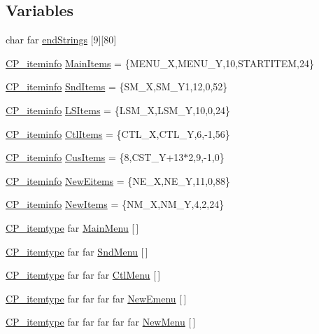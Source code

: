 \subsection*{Variables}
\begin{DoxyCompactItemize}
\item 
char far \hyperlink{WL__MENU_8C_a8e30ff9c9e815ba886bfde0ef75be6d8}{endStrings} \mbox{[}9\mbox{]}\mbox{[}80\mbox{]}
\item 
\hyperlink{structCP__iteminfo}{CP\_\-iteminfo} \hyperlink{WL__MENU_8C_a93c27abff0c41dacc4c91cba6616ebc8}{MainItems} = \{MENU\_\-X,MENU\_\-Y,10,STARTITEM,24\}
\item 
\hyperlink{structCP__iteminfo}{CP\_\-iteminfo} \hyperlink{WL__MENU_8C_a8810a70d8c0aacc1ea82e104825ef35e}{SndItems} = \{SM\_\-X,SM\_\-Y1,12,0,52\}
\item 
\hyperlink{structCP__iteminfo}{CP\_\-iteminfo} \hyperlink{WL__MENU_8C_a34ddf48c23c11489c6b6a7a538eae0da}{LSItems} = \{LSM\_\-X,LSM\_\-Y,10,0,24\}
\item 
\hyperlink{structCP__iteminfo}{CP\_\-iteminfo} \hyperlink{WL__MENU_8C_aa93dc2e5fac3ee3c385889cde68024dc}{CtlItems} = \{CTL\_\-X,CTL\_\-Y,6,-\/1,56\}
\item 
\hyperlink{structCP__iteminfo}{CP\_\-iteminfo} \hyperlink{WL__MENU_8C_a30fed5772336d6185ad27e183642b26e}{CusItems} = \{8,CST\_\-Y+13$\ast$2,9,-\/1,0\}
\item 
\hyperlink{structCP__iteminfo}{CP\_\-iteminfo} \hyperlink{WL__MENU_8C_a938f63a08d947fa7b0abf03c1349115a}{NewEitems} = \{NE\_\-X,NE\_\-Y,11,0,88\}
\item 
\hyperlink{structCP__iteminfo}{CP\_\-iteminfo} \hyperlink{WL__MENU_8C_a4374f166e5cf27153b8a6680ae1d0289}{NewItems} = \{NM\_\-X,NM\_\-Y,4,2,24\}
\item 
\hyperlink{structCP__itemtype}{CP\_\-itemtype} far \hyperlink{WL__MENU_8C_a6d3982b9d13e9f258a6229f7c6259fd2}{MainMenu} \mbox{[}$\,$\mbox{]}
\item 
\hyperlink{structCP__itemtype}{CP\_\-itemtype} far far \hyperlink{WL__MENU_8C_a59f90a4c2260476a35128aaffd9a8acb}{SndMenu} \mbox{[}$\,$\mbox{]}
\item 
\hyperlink{structCP__itemtype}{CP\_\-itemtype} far far far \hyperlink{WL__MENU_8C_a9bb024a29eb8f889628f83ebfce7ee3e}{CtlMenu} \mbox{[}$\,$\mbox{]}
\item 
\hyperlink{structCP__itemtype}{CP\_\-itemtype} far far far far \hyperlink{WL__MENU_8C_a85bfcab0002ae45a5d151750dee054d8}{NewEmenu} \mbox{[}$\,$\mbox{]}
\item 
\hyperlink{structCP__itemtype}{CP\_\-itemtype} far far far far far \hyperlink{WL__MENU_8C_af9e9fe99a5785282fa54183df1cadb9d}{NewMenu} \mbox{[}$\,$\mbox{]}

\end{DoxyCompactItemize}
